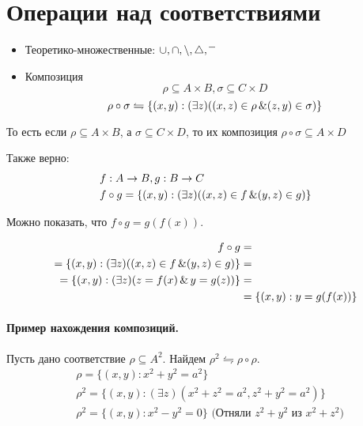 

\title{}
\author{Козырнов Александр Дмитриевич, ИУ7-32Б}
\date{\today}


\section{Операции над соответствиями}

\begin{itemize}
	\item Теоретико-множественные: $ \cup, \cap, \setminus, \operatorname{\triangle}, \overline{\phantom{x}}$ 
	\item Композиция \[
	\rho \subseteq A\times B, \sigma \subseteq C\times D
	\] 
	\[
	\rho \circ \sigma \leftrightharpoons \{(x,y):(\exists z)((x,z) \in \rho\operatorname{\&}(z,y)\in \sigma)\} 
	\] 
\end{itemize}

То есть если $\rho \subseteq A\times B$, а $\sigma \subseteq C\times D$, то их композиция
$\rho \circ \sigma \subseteq A\times D$

\medskip

Также верно:
\begin{align*}
	&f:A \to B, g:B \to C \\
	&f \circ g = \{(x,y):(\exists z)((x,z)\in f \operatorname{\&} (y,z)\in g)\}
\end{align*}

Можно показать, что $f \circ g = g(f(x))$.
\begin{myproof}
\begin{align*}
	f \circ g &= \\
	= \{(x,y):(\exists z)((x,z)\in f \operatorname{\&} (y,z)\in g)\}&= \\
	= \{(x,y):(\exists z)(z=f(x) \operatorname{\&} y=g(z))\} &= \\
						     &= \{(x,y):y=g(f(x))\}  
\end{align*}
\end{myproof}

\medskip

\paragraph*{Пример нахождения композиций.}
Пусть дано соответствие $\rho \subseteq A^2$. Найдем $\rho^2 \leftrightharpoons \rho \circ \rho$.
\begin{align*}
	&\rho = \{(x,y):x^2+y^2=a^2\} \\
	&\rho^2 = \{(x,y):(\exists z)(x^2+z^2=a^2, z^2+y^2=a^2)\} \\
	&\rho^2 = \{(x,y):x^2-y^2=0\}\text{ (Отняли $z^2+y^2$ из $x^2+z^2$)}
\end{align*}

